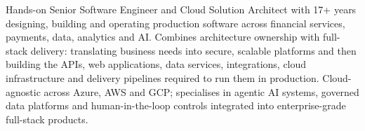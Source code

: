 \documentclass[11pt,a4paper,sans]{moderncv}
\begin{document}
\makecvtitle


\vspace{6pt}
\small{Hands-on Senior Software Engineer and Cloud Solution Architect with 17+ years designing, building and operating production software across financial services, payments, data, analytics and AI. Combines architecture ownership with full-stack delivery: translating business needs into secure, scalable platforms and then building the APIs, web applications, data services, integrations, cloud infrastructure and delivery pipelines required to run them in production. Cloud-agnostic across Azure, AWS and GCP; specialises in agentic AI systems, governed data platforms and human-in-the-loop controls integrated into enterprise-grade full-stack products.}

\end{document}
